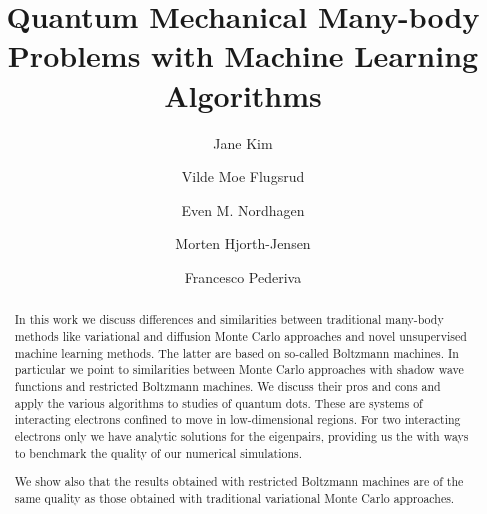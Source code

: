 \documentclass[aip,jcp,reprint,floatfix]{revtex4-1}
\begin{document}
\title{Quantum Mechanical Many-body Problems with Machine Learning Algorithms}

\author{Jane Kim}

\author{Vilde Moe Flugsrud}

\author{Even M. Nordhagen}


\author{Morten Hjorth-Jensen}

\author{Francesco Pederiva}

\begin{abstract}

In this work we discuss differences and similarities between
traditional many-body methods like variational and diffusion Monte
Carlo approaches and novel unsupervised machine learning methods. The
latter are based on so-called Boltzmann machines. In particular we
point to similarities between Monte Carlo approaches with shadow wave
functions and restricted Boltzmann machines. We discuss their pros and
cons and apply the various algorithms to studies of quantum
dots. These are systems of interacting electrons confined to move in
low-dimensional regions. For two interacting electrons only we have
analytic solutions for the eigenpairs, providing us the with ways to benchmark the quality of our numerical simulations. 

We show
also that the results obtained with restricted Boltzmann machines are
of the same quality as those obtained with traditional variational
Monte Carlo approaches.

\end{abstract}


\maketitle
\end{document}

